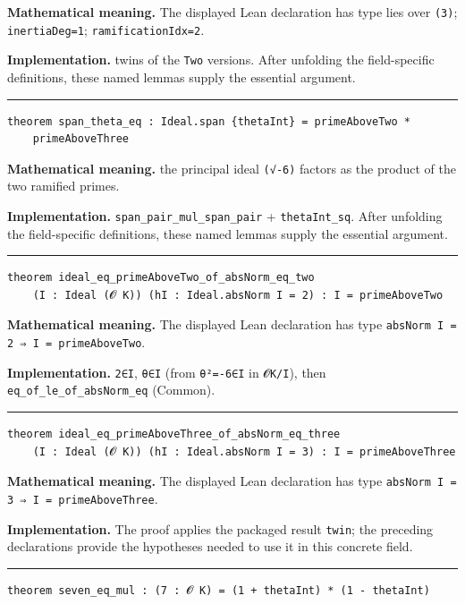 \documentclass[UTF8,a4paper,11pt,fontset=fandol]{ctexart}
\theoremstyle{definition}
\newcommand{\statementsep}{\par\medskip\hrule\medskip}
\begin{document}
\noindent\textbf{Mathematical meaning.} The displayed Lean declaration has type lies over \texttt{(3)}; \texttt{inertiaDeg=1}; \texttt{ramificationIdx=2}.\par
\noindent\textbf{Implementation.} twins of the \texttt{Two} versions. After unfolding the field-specific definitions, these named lemmas supply the essential argument.\par
\statementsep
\begin{verbatim}
theorem span_theta_eq : Ideal.span {thetaInt} = primeAboveTwo *
    primeAboveThree
\end{verbatim}
\noindent\textbf{Mathematical meaning.} the principal ideal \texttt{(√-6)} factors as the product of the two ramified primes.\par
\noindent\textbf{Implementation.} \texttt{span\_\allowbreak{}pair\_\allowbreak{}mul\_\allowbreak{}span\_\allowbreak{}pair} + \texttt{thetaInt\_\allowbreak{}sq}. After unfolding the field-specific definitions, these named lemmas supply the essential argument.\par
\statementsep
\begin{verbatim}
theorem ideal_eq_primeAboveTwo_of_absNorm_eq_two
    (I : Ideal (𝓞 K)) (hI : Ideal.absNorm I = 2) : I = primeAboveTwo
\end{verbatim}
\noindent\textbf{Mathematical meaning.} The displayed Lean declaration has type \texttt{absNorm I = 2 ⇒ I = primeAboveTwo}.\par
\noindent\textbf{Implementation.} \texttt{2∈I}, \texttt{θ∈I} (from \texttt{θ²=-6∈I} in \texttt{𝓞K/\allowbreak{}I}), then \texttt{eq\_\allowbreak{}of\_\allowbreak{}le\_\allowbreak{}of\_\allowbreak{}absNorm\_\allowbreak{}eq} (Common).\par
\statementsep
\begin{verbatim}
theorem ideal_eq_primeAboveThree_of_absNorm_eq_three
    (I : Ideal (𝓞 K)) (hI : Ideal.absNorm I = 3) : I = primeAboveThree
\end{verbatim}
\noindent\textbf{Mathematical meaning.} The displayed Lean declaration has type \texttt{absNorm I = 3 ⇒ I = primeAboveThree}.\par
\noindent\textbf{Implementation.} The proof applies the packaged result \texttt{twin}; the preceding declarations provide the hypotheses needed to use it in this concrete field.\par
\statementsep
\begin{verbatim}
theorem seven_eq_mul : (7 : 𝓞 K) = (1 + thetaInt) * (1 - thetaInt)
\end{verbatim}
\end{document}
